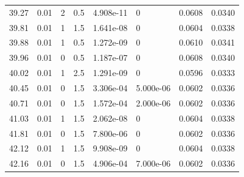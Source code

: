 \documentclass[preview]{standalone}
\begin{document}
{{{{{\begin{tabular}{L{1.2cm}C{1.2cm} C{0.3cm}C{0.5cm} C{1.4cm}C{1.4cm} C{1.4cm}C{1.4cm}}
  39.27  &  0.01  & 2     & 0.5 &  4.908e-11  & 0  & 0.0608 &  0.0340   \\ 
  39.81  &  0.01  & 1     & 1.5 &  1.641e-08  & 0  & 0.0604 &  0.0338   \\ 
  39.88  &  0.01  & 1     & 0.5 &  1.272e-09  & 0  & 0.0610 &  0.0341   \\ 
  39.96  &  0.01  & 0     & 0.5 &  1.187e-07  & 0  & 0.0608 &  0.0340   \\ 
  40.02  &  0.01  & 1     & 2.5 &  1.291e-09  & 0  & 0.0596 &  0.0333   \\ 
  40.45  &  0.01  & 0     & 1.5 &  3.306e-04  & 5.000e-06  & 0.0602 &  0.0336   \\ 
  40.71  &  0.01  & 0     & 1.5 &  1.572e-04  & 2.000e-06  & 0.0602 &  0.0336   \\ 
  41.03  &  0.01  & 1     & 1.5 &  2.062e-08  & 0  & 0.0604 &  0.0338   \\ 
  41.81  &  0.01  & 0     & 1.5 &  7.800e-06  & 0  & 0.0602 &  0.0336   \\ 
  42.12  &  0.01  & 1     & 1.5 &  9.908e-09  & 0  & 0.0604 &  0.0338   \\ 
  42.16  &  0.01  & 0     & 1.5 &  4.906e-04  & 7.000e-06  & 0.0602 &  0.0336   \\ 
\hline 
\end{tabular} 

}}}}}
\end{document}
